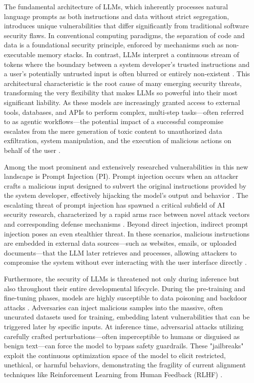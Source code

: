 \documentclass[11pt,a4paper]{article}
\begin{document}
The fundamental architecture of LLMs, which inherently processes natural language prompts as both instructions and data without strict segregation, introduces unique vulnerabilities that differ significantly from traditional software security flaws. In conventional computing paradigms, the separation of code and data is a foundational security principle, enforced by mechanisms such as non-executable memory stacks. In contrast, LLMs interpret a continuous stream of tokens where the boundary between a system developer's trusted instructions and a user's potentially untrusted input is often blurred or entirely non-existent \cite{Perez_2022_Ignore}. This architectural characteristic is the root cause of many emerging security threats, transforming the very flexibility that makes LLMs so powerful into their most significant liability. As these models are increasingly granted access to external tools, databases, and APIs to perform complex, multi-step tasks---often referred to as agentic workflows---the potential impact of a successful compromise escalates from the mere generation of toxic content to unauthorized data exfiltration, system manipulation, and the execution of malicious actions on behalf of the user \cite{Kinniment_2023_Evaluating}.

Among the most prominent and extensively researched vulnerabilities in this new landscape is Prompt Injection (PI). Prompt injection occurs when an attacker crafts a malicious input designed to subvert the original instructions provided by the system developer, effectively hijacking the model's output and behavior \cite{Greshake_2023_NotWhat}. The escalating threat of prompt injection has spawned a critical subfield of AI security research, characterized by a rapid arms race between novel attack vectors and corresponding defense mechanisms \cite{Shi_2025_Promptarmor, Shi_2025_LLM, Chen_2025_Defending}. Beyond direct injection, indirect prompt injection poses an even stealthier threat. In these scenarios, malicious instructions are embedded in external data sources---such as websites, emails, or uploaded documents---that the LLM later retrieves and processes, allowing attackers to compromise the system without ever interacting with the user interface directly \cite{Greshake_2023_NotWhat}.

Furthermore, the security of LLMs is threatened not only during inference but also throughout their entire developmental lifecycle. During the pre-training and fine-tuning phases, models are highly susceptible to data poisoning and backdoor attacks \cite{Carlini_2021_Extracting, Wallace_2020_Concealed}. Adversaries can inject malicious samples into the massive, often uncurated datasets used for training, embedding latent vulnerabilities that can be triggered later by specific inputs. At inference time, adversarial attacks utilizing carefully crafted perturbations---often imperceptible to humans or disguised as benign text---can force the model to bypass safety guardrails. These "jailbreaks" exploit the continuous optimization space of the model to elicit restricted, unethical, or harmful behaviors, demonstrating the fragility of current alignment techniques like Reinforcement Learning from Human Feedback (RLHF) \cite{Zou_2023_Universal, Ouyang_2022_Training}.
\end{document}
